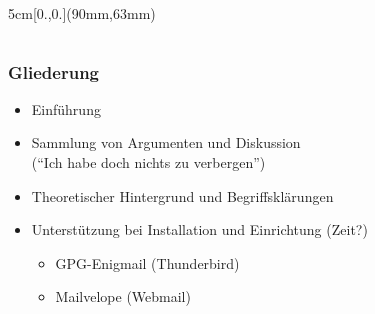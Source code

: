 \documentclass{beamer}
\begin{document}
\begin{frame}[label=ct1]
\begin{columns}
\begin{textblock*}{5cm}[0.,0.](90mm,63mm)
\end{textblock*}  

~
\end{columns}
  
\end{frame}


\begin{frame}[label=ol1]
  \frametitle{Gliederung}
  \begin{itemize}
   \item Einführung
   \item Sammlung von Argumenten und Diskussion\\
   ("`Ich habe doch nichts zu verbergen"')
   \item Theoretischer Hintergrund und Begriffsklärungen
   \item Unterstützung bei Installation und Einrichtung (Zeit?)
   \begin{itemize}
    \item GPG-Enigmail (Thunderbird)
   \item Mailvelope (Webmail)
   \end{itemize}

  \end{itemize}

\end{frame}

\end{document}
